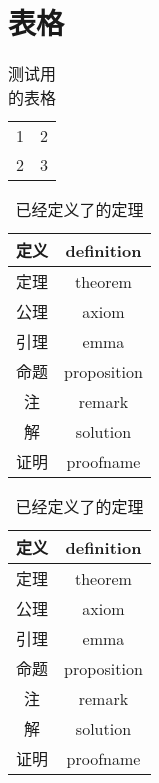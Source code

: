 \chapter{表格}


\begin{table}
	\centering
	\caption{测试用的表格}	
	\begin{tabular}{cc}
		  1    &      2  \\
		  2    &      3
	\end{tabular}
\end{table}

\begin{tcode}
\begin{table}
	\centering
	\caption{已经定义了的定理}
	\begin{tabular}{|c|c|}
		\hline               
		定义      &   definition  \\   \hline 
		定理      &   theorem    \\   \hline
		公理      &   axiom		\\   \hline
		引理		&	emma		\\   \hline
		命题	   &	proposition \\  \hline
		注		  &	  remark		\\  \hline
		解		  &	  solution   \\ \hline
		证明		&	proofname  \\ \hline
		
	\end{tabular}
\end{table}
\end{tcode}


\begin{table}
	\centering
	\caption{已经定义了的定理}
	\begin{tabular}{|c|c|}
		\hline               
		定义      &   definition  \\   \hline 
		定理      &   theorem    \\   \hline
		公理      &   axiom		\\   \hline
		引理		&	emma		\\   \hline
		命题	   &	proposition \\  \hline
		注		  &	  remark		\\  \hline
		解		  &	  solution   \\ \hline
		证明		&	proofname  \\ \hline
 		       
	\end{tabular}
\end{table}


